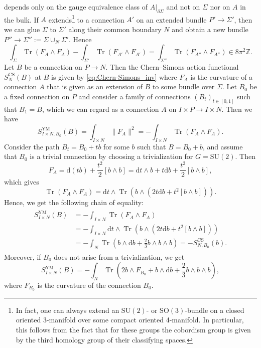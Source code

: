 \documentclass[11pt,colorinlistoftodos]{amsart}
\numberwithin{equation}{subsection}
\theoremstyle{plain}
\theoremstyle{definition}
\theoremstyle{remark}
\newcommand{\Z}{\mathbb{Z}}
\newcommand{\dd}{{\mathrm{d}}}
\DeclareMathOperator{\tr}{Tr}
\newcommand{\de}{\partial}
\begin{document}
depends only on the gauge equivalence class of $A\big|_{\de\Sigma}$ and not on $\Sigma$ nor on $A$ in the bulk. If $A$ extends\footnote{In fact, one can always extend an $\mathrm{SU}(2)$- or $\mathrm{SO}(3)$-bundle on a closed oriented 3-manifold over some compact oriented 4-manifold. In particular, this follows from the fact that for these groups the cobordism group is given by the third homology group of their classifying spaces.} to a connection $A'$ on an extended bundle $P'\to \Sigma'$, then we can glue $\Sigma$ to $\Sigma'$ along their common boundary $N$ and obtain a new bundle $P''\to \Sigma'':=\Sigma\cup_{N}\Sigma'$. Hence
\begin{equation}
    \int_\Sigma\tr(F_{A}\land F_A)-\int_{\Sigma'}\tr(F_{A'}\land F_{A'})=\int_{\Sigma''}\tr(F_{A''}\land F_{A''})\in 8\pi^2\Z.
\end{equation}
Let $B$ be a connection on $P\to N$. Then the Chern--Simons action functional $S^\mathrm{CS}_{N}(B)$ at $B$ is given by \eqref{eq:Chern-Simons_inv} where $F_A$ is the curvature of a connection $A$ that is given as an extension of $B$ to some bundle over $\Sigma$.
Let $B_0$ be a fixed connection on $P$ and consider a family of connections $(B_t)_{t\in[0,1]}$ such that $B_1=B$, which we can regard as a connection $A$ on $I\times P\to I\times N$. Then we have 
\begin{equation}
    S^\mathrm{YM}_{I\times N,B_0}(B)=\int_{I\times N}\|F_A\|^2=-\int_{I\times N}\tr(F_A\land F_A).
\end{equation}
Consider the path $B_t=B_0+tb$ for some $b$ such that $B=B_0+b$, and assume that $B_0$ is a trivial connection by choosing a trivialization for $G=\mathrm{SU}(2)$. Then
\begin{equation}
    F_A=\dd(tb)+\frac{t^2}{2}[b\land b]=\dd t\land b+t\dd b+\frac{t^2}{2}[b\land b],
\end{equation}
which gives
\begin{equation}
    \tr(F_A\land F_A)=\dd t\land \tr(b\land (2t\dd b+t^2[b\land b])).
\end{equation}
Hence, we get the following chain of equality:
\begin{align}
\begin{split}
    S^\mathrm{YM}_{I\times N}(B)&=-\int_{I\times N}\tr(F_A\land F_A)\\
    &=-\int_{I\times N}\dd t\land \tr(b\land(2t\dd b+t^2[b\land b]))\\
    &=-\int_{N}\tr\left(b\land \dd b+\frac{2}{3}b\land b\land b\right)=-S^\mathrm{CS}_{N,B_0}(b).
\end{split}
\end{align}
Moreover, if $B_0$ does not arise from a trivialization, we get 
\begin{equation}
   S^\mathrm{YM}_{I\times N}(B)=-\int_{N}\tr\left(2b\land F_{B_0}+b\land \dd b+\frac{2}{3}b\land b\land b\right),
\end{equation}
where $F_{B_0}$ is the curvature of the connection $B_0$.
\end{document}
